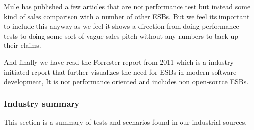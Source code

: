 Mule has published a few articles that are not performance test but instead some kind of sales comparison with a number of other ESBs\cite{mulevsjboss,mulevsglassfish,mulevsservicemix}.
But we feel its important to include this anyway as we feel it shows a direction from doing performance tests to doing some sort of vague sales pitch without any numbers to back up their claims.

And finally we have read the Forrester report \cite{forrester11} from 2011 which is a industry initiated report that further visualizes the need for ESBs in modern software development, It is not performance oriented and includes non open-source ESBs.

\newpage
\subsubsection{Industry summary}
This section is a summary of tests and scenarios found in our industrial sources.

